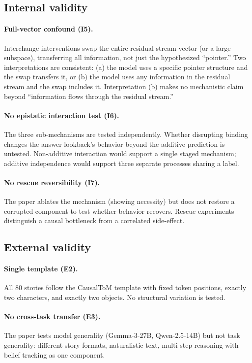 \documentclass[11pt]{article}
\begin{document}
\subsection{Internal validity}

\paragraph{Full-vector confound (I5).}
Interchange interventions swap the entire residual stream vector (or a large subspace), transferring all information, not just the hypothesized ``pointer.'' Two interpretations are consistent: (a) the model uses a specific pointer structure and the swap transfers it, or (b) the model uses any information in the residual stream and the swap includes it. Interpretation (b) makes no mechanistic claim beyond ``information flows through the residual stream.''

\paragraph{No epistatic interaction test (I6).}
The three sub-mechanisms are tested independently. Whether disrupting binding changes the answer lookback's behavior beyond the additive prediction is untested. Non-additive interaction would support a single staged mechanism; additive independence would support three separate processes sharing a label.

\paragraph{No rescue reversibility (I7).}
The paper ablates the mechanism (showing necessity) but does not restore a corrupted component to test whether behavior recovers. Rescue experiments distinguish a causal bottleneck from a correlated side-effect.

\subsection{External validity}

\paragraph{Single template (E2).}
All 80 stories follow the CausalToM template with fixed token positions, exactly two characters, and exactly two objects. No structural variation is tested.

\paragraph{No cross-task transfer (E3).}
The paper tests model generality (Gemma-3-27B, Qwen-2.5-14B) but not task generality: different story formats, naturalistic text, multi-step reasoning with belief tracking as one component.
\end{document}
